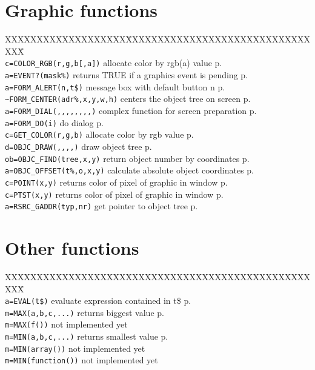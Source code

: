 \section{Graphic functions}
\begin{tabbing}
XXXXXXXXXXXXXXXXXXX\=XXXXXXXXXXXXXXXXXXXXXXXXXXXXXXXX\=\kill\\
\verb|c=COLOR_RGB(r,g,b[,a])| \> allocate color by rgb(a) value\> p.\pageref{COLORiRGB}\\
\verb|a=EVENT?(mask%)| \> returns TRUE if a graphics event is pending \> p.\pageref{EVENTf}\\
\verb|a=FORM_ALERT(n,t$)| \>	 message box with default button n\> p.\pageref{FORMiALERT}\\
\verb|~FORM_CENTER(adr%,x,y,w,h)| \>centers the object tree on screen \> p.\pageref{FORMiCENTER}\\
\verb|a=FORM_DIAL(,,,,,,,,)|   \> complex function for screen preparation\> p.\pageref{FORMiDIAL}\\
\verb|a=FORM_DO(i)|            \> do dialog\> p.\pageref{FORMiDO}\\
\verb|c=GET_COLOR(r,g,b)|      \> allocate color by rgb value\> p.\pageref{GETiCOLOR}\\
\verb|d=OBJC_DRAW(,,,,)|       \> draw object tree\> p.\pageref{OBJCiDRAW}\\
\verb|ob=OBJC_FIND(tree,x,y)|  \> return object number by coordinates\> p.\pageref{OBJCiFIND}\\
\verb|a=OBJC_OFFSET(t%,o,x,y)| \> calculate absolute object coordinates\> p.\pageref{OBJCiOFFSET}\\
\verb|c=POINT(x,y)|            \> returns color of pixel of graphic in window\> p.\pageref{POINT}\\
\verb|c=PTST(x,y)|             \> returns color of pixel of graphic in window\> p.\pageref{PTST}\\
\verb|a=RSRC_GADDR(typ,nr)|    \> get pointer to object tree\> p.\pageref{RSRCiGADDR}\\
\end{tabbing}

\section{Other functions}
\begin{tabbing}
XXXXXXXXXXXXXXXXXXX\=XXXXXXXXXXXXXXXXXXXXXXXXXXXXXXXX\=\kill\\
\verb|a=EVAL(t$)|        \> evaluate expression contained in t\$\> p.\pageref{EVAL}\\
\verb|m=MAX(a,b,c,...)|  \> returns biggest value               \> p.\pageref{MAX}\\
\verb|m=MAX(f())| 	 \> not implemented yet\\
\verb|m=MIN(a,b,c,...)|  \>  returns smallest value             \> p.\pageref{MIN}\\
\verb|m=MIN(array())|    \> not implemented yet\\
\verb|m=MIN(function())| \> not implemented yet\\
\end{tabbing}


